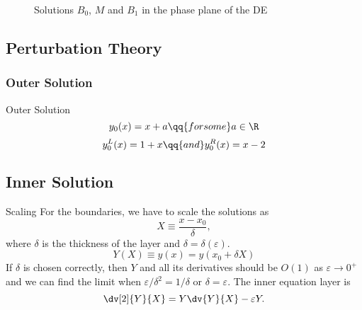 \begin{frame}
    \pause
\end{frame}

\begin{frame}
  \begin{figure}
    \centering
    \caption{Solutions \(B_0\), \(M\) and \(B_1\) in the phase plane of the DE}
  \end{figure}
\end{frame}


\subsection{Perturbation Theory}%
\label{sub:perturbation_theory}

\subsubsection{Outer Solution}%
\label{ssub:outer_solution}
\begin{frame}{Outer Solution}
  \pause \[
      y_0(x) = x + a \qq{for some} a \in \R
  \] \pause \[
    y_0^{L}(x) = 1 + x \qq{and} y_0^{R}(x) = x - 2
  \] 
\end{frame}

\subsection{Inner Solution}%
\label{sub:inner_solution}
\begin{frame}{Scaling}
    For the boundaries, we have to scale the solutions as 
    \[
        X \equiv \frac{x - x_0}{\delta},
    \] where \(\delta\) is the thickness of the layer and \(\delta = \delta(\varepsilon)\).
    \pause
    \[
        Y(X) \equiv y(x) = y(x_0 + \delta X)
    \] 
    \pause If \(\delta\) is chosen correctly, then \(Y\) and all its derivatives should be \(O(1)\) as \(\varepsilon \to
    0^{+}\) and we can find the limit when \(\varepsilon / \delta^2 = 1 / \delta\) or \(\delta = \varepsilon\). \pause
    The inner equation layer is \[
        \dv[2]{Y}{X} = Y \dv{Y}{X} - \varepsilon Y.
    \] 
\end{frame}

